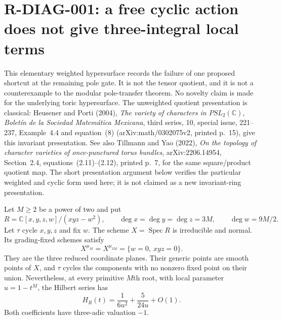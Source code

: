 \section{R-DIAG-001: a free cyclic action does not give three-integral local terms}

This elementary weighted hypersurface records the failure of one
proposed shortcut at the remaining pole gate. It is not the tensor
quotient, and it is not a counterexample to the modular pole-transfer
theorem. No novelty claim is made for the underlying toric hypersurface.
The unweighted quotient presentation is classical: Heusener and Porti
(2004), \emph{The variety of characters in $PSL_2(\mathbb C)$},
\emph{Bolet\'in de la Sociedad Matem\'atica Mexicana}, third series,
10, special issue, 221--237, Example~4.4 and equation~(8)
(arXiv:math/0302075v2, printed p.~15), give this invariant presentation.
See also Tillmann and Yao
(2022), \emph{On the topology of character varieties of once-punctured
torus bundles}, arXiv:2206.14954, Section~2.4, equations~(2.11)--(2.12),
printed p.~7, for the same square/product quotient map. The short
presentation argument below verifies the particular weighted and cyclic
form used here; it is not claimed as a new invariant-ring presentation.

Let $M\ge2$ be a power of two and put
\[
 R=\mathbb C[x,y,z,w]/(xyz-w^2),\qquad
 \deg x=\deg y=\deg z=3M,\qquad \deg w=9M/2.
                                                        \tag{R-DIAG-001a}
\]
Let $\tau$ cycle $x,y,z$ and fix $w$. The scheme
$X=\operatorname{Spec}R$ is irreducible and normal. Its grading-fixed
schemes satisfy
\[
 X^{\mu_M}=X^{\mu_{3M}}=\{w=0,\ xyz=0\}.
                                                        \tag{R-DIAG-001b}
\]
They are the three reduced coordinate planes. Their generic points
are smooth points of $X$, and $\tau$ cycles the components with no
nonzero fixed point on their union. Nevertheless, at every primitive
$M$th root, with local parameter $u=1-t^M$, the Hilbert series has
\[
 H_R(t)=\frac1{6u^2}+\frac5{24u}+O(1).
                                                        \tag{R-DIAG-001c}
\]
Both coefficients have three-adic valuation $-1$.


